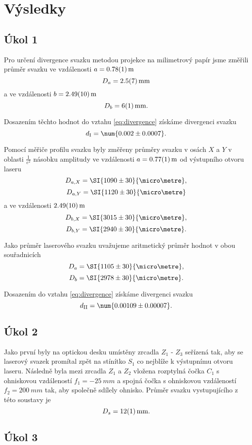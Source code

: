 \documentclass{protokol}
\begin{document}
  \section*{Výsledky}

    \subsection*{Úkol 1}
      Pro určení divergence svazku metodou projekce na milimetrový papír jsme změřili průměr svazku ve vzdálenosti $a = \SI{0.78 \pm 0.01}  {m}$
      $$ D_a = \SI{2.5 \pm 0.7}{mm} $$
      a ve vzdálenosti $b = \SI{2.49 \pm 0.1}{m}$
      $$ D_b = \SI{6 \pm 1}{mm}. $$

      Dosazením těchto hodnot do vztahu \eqref{eq:divergence} získáme divergenci svazku
      $$ d_\text{I} = \num{0.002 \pm 0.0007}. $$

      Pomocí měřiče profilu svazku byly změřeny průměry svazku v osách $X$ a $Y$ v oblasti $\frac{1}{e^2}$ násobku amplitudy ve vzdálenosti $a = \SI{0.77 \pm 0.01}{m}$ od výstupního otvoru laseru
      $$ D_{a, X} = \SI{1090 \pm 30}{\micro\metre}, $$
      $$ D_{a, Y} = \SI{1120 \pm 30}{\micro\metre} $$
      a ve vzdálenosti $\SI{2.49 \pm 0.1}{m}$
      $$ D_{b, X} = \SI{3015 \pm 30}{\micro\metre}, $$
      $$ D_{b, Y} = \SI{2940 \pm 30}{\micro\metre}. $$
       
      Jako průměr laserového svazku uvažujeme aritmetický průměr hodnot v obou souřadnicích
      $$ D_a = \SI{1105 \pm 30}{\micro\metre}, $$
      $$ D_b = \SI{2978 \pm 30}{\micro\metre}. $$

      Dosazením do vztahu \eqref{eq:divergence} získáme divergenci svazku
      $$ d_\text{II} = \num{0.00109 \pm 0.00007}. $$

    \subsection*{Úkol 2}

      Jako první byly na optickou desku umístěny zrcadla $Z_1$ - $Z_3$ seřízená tak, aby se laserový svazek promítal zpět na stínítko $S_1$ co nejblíže k výstupnímu otvoru laseru. Následně byla mezi zrcadla $Z_1$ a $Z_2$ vložena rozptylná čočka $C_1$ s ohniskovou vzdáleností $f_1 = \SI{-25}{mm}$ a spojná čočka s ohniskovou vzdáleností $f_2 = \SI{200}{mm}$ tak, aby společně sdílely ohnisko. Průměr svazku vystupujícího z této soustavy je 
      $$ D_s = \SI{12 \pm 1}{mm}. $$

    \subsection*{Úkol 3}
\end{document}
